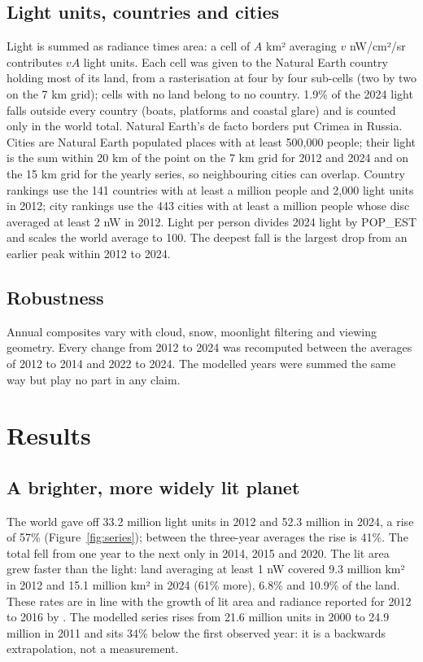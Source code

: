 \documentclass[11pt,a4paper]{article}
\begin{document}
\subsection{Light units, countries and cities}
Light is summed as radiance times area: a cell of $A$ km² averaging $v$ nW/cm²/sr contributes $vA$ light units. Each cell was given to the Natural Earth country holding most of its land, from a rasterisation at four by four sub-cells (two by two on the 7 km grid); cells with no land belong to no country. 1.9\% of the 2024 light falls outside every country (boats, platforms and coastal glare) and is counted only in the world total. Natural Earth's de facto borders put Crimea in Russia. Cities are Natural Earth populated places with at least 500,000 people; their light is the sum within 20 km of the point on the 7 km grid for 2012 and 2024 and on the 15 km grid for the yearly series, so neighbouring cities can overlap. Country rankings use the 141 countries with at least a million people and 2,000 light units in 2012; city rankings use the 443 cities with at least a million people whose disc averaged at least 2 nW in 2012. Light per person divides 2024 light by POP\_EST and scales the world average to 100. The deepest fall is the largest drop from an earlier peak within 2012 to 2024.

\subsection{Robustness}
Annual composites vary with cloud, snow, moonlight filtering and viewing geometry. Every change from 2012 to 2024 was recomputed between the averages of 2012 to 2014 and 2022 to 2024. The modelled years were summed the same way but play no part in any claim.

\section{Results}
\subsection{A brighter, more widely lit planet}
The world gave off 33.2 million light units in 2012 and 52.3 million in 2024, a rise of 57\% (Figure~\ref{fig:series}); between the three-year averages the rise is 41\%. The total fell from one year to the next only in 2014, 2015 and 2020. The lit area grew faster than the light: land averaging at least 1 nW covered 9.3 million km² in 2012 and 15.1 million km² in 2024 (61\% more), 6.8\% and 10.9\% of the land. These rates are in line with the growth of lit area and radiance reported for 2012 to 2016 by \citet{kyba2017}. The modelled series rises from 21.6 million units in 2000 to 24.9 million in 2011 and sits 34\% below the first observed year: it is a backwards extrapolation, not a measurement.
\end{document}
